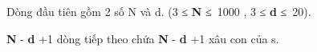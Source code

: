 Dòng đầu tiên gồm 2 số N và d. (3 ≤   \textbf{    N   }   ≤ 1000 , 3 ≤   \textbf{    d   }   ≤ 20).  

\textbf{    N   }   -   \textbf{    d   }   +1 dòng tiếp theo chứa   \textbf{    N   }   -   \textbf{    d   }   +1 xâu con của s.  

\